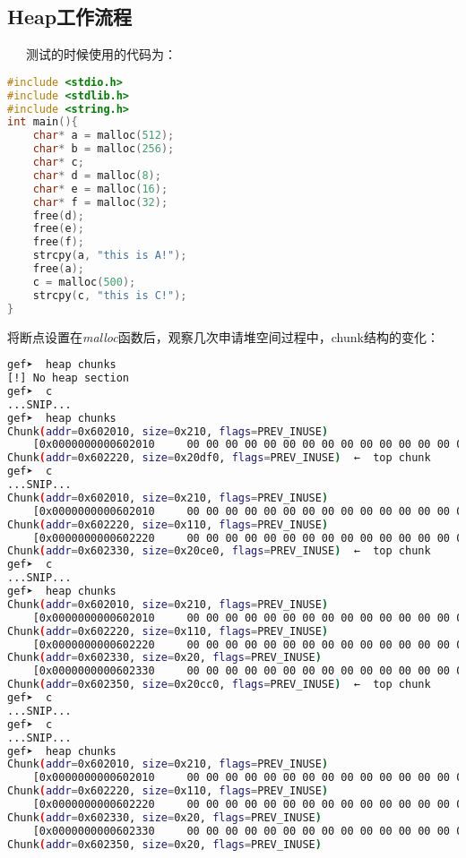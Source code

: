 \documentclass[12pt]{article}  %
\begin{document}
\subsection{Heap工作流程}
\ \ \ 测试的时候使用的代码为：
\begin{lstlisting}[language=c]
#include <stdio.h>
#include <stdlib.h>
#include <string.h>
int main(){
	char* a = malloc(512);
	char* b = malloc(256);
	char* c;
    char* d = malloc(8);
    char* e = malloc(16);
    char* f = malloc(32);
    free(d);
    free(e);
    free(f);
	strcpy(a, "this is A!");
	free(a);
	c = malloc(500);
	strcpy(c, "this is C!");
}
\end{lstlisting}\par
将断点设置在\emph{malloc}函数后，观察几次申请堆空间过程中，chunk结构的变化：
\begin{lstlisting}[language=sh]
gef➤  heap chunks
[!] No heap section
gef➤  c
...SNIP...
gef➤  heap chunks
Chunk(addr=0x602010, size=0x210, flags=PREV_INUSE)
    [0x0000000000602010     00 00 00 00 00 00 00 00 00 00 00 00 00 00 00 00     ................]
Chunk(addr=0x602220, size=0x20df0, flags=PREV_INUSE)  ←  top chunk
gef➤  c
...SNIP...
Chunk(addr=0x602010, size=0x210, flags=PREV_INUSE)
    [0x0000000000602010     00 00 00 00 00 00 00 00 00 00 00 00 00 00 00 00     ................]
Chunk(addr=0x602220, size=0x110, flags=PREV_INUSE)
    [0x0000000000602220     00 00 00 00 00 00 00 00 00 00 00 00 00 00 00 00     ................]
Chunk(addr=0x602330, size=0x20ce0, flags=PREV_INUSE)  ←  top chunk
gef➤  c
...SNIP...
gef➤  heap chunks
Chunk(addr=0x602010, size=0x210, flags=PREV_INUSE)
    [0x0000000000602010     00 00 00 00 00 00 00 00 00 00 00 00 00 00 00 00     ................]
Chunk(addr=0x602220, size=0x110, flags=PREV_INUSE)
    [0x0000000000602220     00 00 00 00 00 00 00 00 00 00 00 00 00 00 00 00     ................]
Chunk(addr=0x602330, size=0x20, flags=PREV_INUSE)
    [0x0000000000602330     00 00 00 00 00 00 00 00 00 00 00 00 00 00 00 00     ................]
Chunk(addr=0x602350, size=0x20cc0, flags=PREV_INUSE)  ←  top chunk
gef➤  c
...SNIP...
gef➤  c
...SNIP...
gef➤  heap chunks
Chunk(addr=0x602010, size=0x210, flags=PREV_INUSE)
    [0x0000000000602010     00 00 00 00 00 00 00 00 00 00 00 00 00 00 00 00     ................]
Chunk(addr=0x602220, size=0x110, flags=PREV_INUSE)
    [0x0000000000602220     00 00 00 00 00 00 00 00 00 00 00 00 00 00 00 00     ................]
Chunk(addr=0x602330, size=0x20, flags=PREV_INUSE)
    [0x0000000000602330     00 00 00 00 00 00 00 00 00 00 00 00 00 00 00 00     ................]
Chunk(addr=0x602350, size=0x20, flags=PREV_INUSE)

\end{lstlisting}
\end{document}
